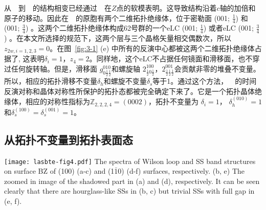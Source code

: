 从~\ti~到~\tci~的结构相变已经通过~\ti~在$Z$点的软模表明。这导致结构沿着$c$轴的加倍和原子的移动。因此在~\tci~的原胞有两个二维拓扑绝缘体，位于密勒面 (001; $\frac{1}{4}$) 和 (001; $\frac{3}{4}$) 。这两个二维拓扑绝缘体构成62号群的一个eLC (001; $\frac{1}{4}$) 或者eLC  (001; $\frac{3}{4}$) 。在本文所选择的规范下，这两个层与三个晶格矢量相交偶数次，所以$z_{2w, i=1, 2, 3}=0$。在图~\ref{fig:3-1} (e) 中所有的反演中心都被这两个二维拓扑绝缘体占据了, 这表明$\delta_i=1$，$z_4=2$。同样地，这个eLC不占据任何镜面和滑移面，也不穿过任何旋转轴。但是，滑移面 $g^{010}_{0\frac{1}{2}\frac{1}{2}}$和螺旋轴 $2^{100}_{ \frac{1}{2}0\frac{1}{2}}$，$2^{001}_{\frac{1}{2}\frac{1}{2}\frac{1}{2}}$会贡献非零的堆叠不变量。所以，相应的拓扑滑移不变量$\delta_h$和螺旋不变量$\delta_s$等于1。通过这个方法，~\tci~的时间反演对称和晶体对称性所保护的拓扑态都被完全确定下来了。它是一个拓扑晶体绝缘体，相应的对称性指标为$\mathbb Z_{2,2,2,4}=(0002)$，拓扑不变量为  $\delta_i=1$， $\delta_{h}^{(010)}=1$和$\delta_{s}^{(100)}=\delta_{s}^{(001)}=1$。
 

\subsection{从拓扑不变量到拓扑表面态}

\begin{figure*}[!htb]
\centering
\texttt{[image: lasbte-fig4.pdf]}
{
The spectra of Wilson loop and SS band structures on surface BZ of (100) (a-c) and (1$\bar 1$0) (d-f) surfaces, respectively. (b, e) The zoomed in image of the shadowed part in (a) and (d), respectively. It can be seen clearly that there are hourglass-like SSs in (b, c) but trivial SSs with full gap in (e, f). ~\citep{qian2020layer}
}
\label{fig:3-4}
\end{figure*}

